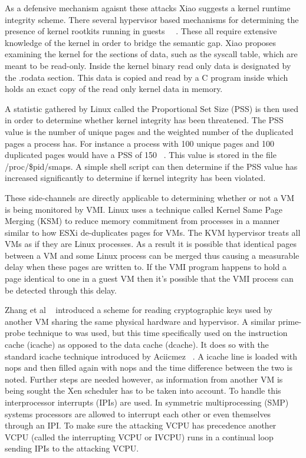 As a defensive mechanism agaisnt these attacks Xiao suggests a kernel runtime integrity scheme.  There several hypervisor based mechanisms for determining the presence of kernel rootkits running in guests ~\cite{butler_windows_2005}~\cite{hoglund_*real*_1999}. These all require extensive knowledge of the kernel in order to bridge the semantic gap. Xiao proposes examining the kernel for the sections of data, such as the syscall table, which are meant to be read-only. Inside the kernel binary read only data is designated by the .rodata section. This data is copied and read by a C program inside which holds an exact copy of the read only kernel data in memory. 

A statistic gathered by Linux called the Proportional Set Size (PSS) is then used in order to determine whether kernel integrity has been threatened. The PSS value is the number of unique pages and the weighted number of the duplicated pages a process has. For instance a process with 100 unique pages and 100 duplicated pages would have a PSS of 150 ~\cite{xiao_security_2013}. This value is stored in the file /proc/\$pid/smaps. A simple shell script can then determine if the PSS value has increased significantly to determine if kernel integrity has been violated. 

These side-channels are directly applicable to determining whether or not a VM is being monitored by VMI. Linux uses a technique called Kernel Same Page Merging (KSM) to reduce memory commitment from processes in a manner similar to how ESXi de-duplicates pages for VMs. The KVM hypervisor treats all VMs as if they are Linux processes. As a result it is possible that identical pages between a VM and some Linux process can be merged thus causing a measurable delay when these pages are written to. If the VMI program happens to hold a page identical to one in a guest VM then it's possible that the VMI process can be detected through this delay. 

Zhang et al ~\cite{zhang_cross-vm_2012} introduced a scheme for reading cryptographic keys used by another VM sharing the same physical hardware and hypervisor. A similar prime-probe technique to was used, but this time specifically used on the instruction cache (icache) as opposed to the data cache (dcache). It does so with the standard icache technique introduced by Aciicmez ~\cite{aciiamez_yet_2007}. A icache line is loaded with nops and then filled again with nops and the time difference between the two is noted. Further steps are needed however, as information from another VM is being sought the Xen scheduler has to be taken into account. To handle this interprocessor interrupts (IPIs) are used. In symmetric multiprocessing (SMP) systems processors are allowed to interrupt each other or even themselves through an IPI. To make sure the attacking VCPU has precedence another VCPU (called the interrupting VCPU or IVCPU) runs in a continual loop sending IPIs to the attacking VCPU.

